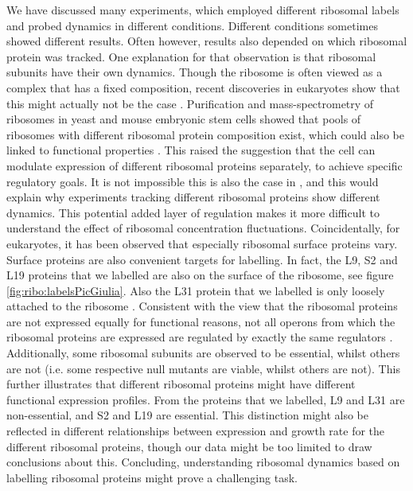 We have discussed many experiments, which employed different ribosomal labels and probed dynamics in different conditions.
%
Different conditions sometimes showed different results.
%
Often however, results also depended on which ribosomal protein was tracked.
%
One explanation for that observation is that ribosomal subunits have their own dynamics.
%
Though the ribosome is often viewed as a complex that has a fixed composition, 
recent discoveries in eukaryotes show that this might actually not be the case \cite{Preiss2016, Slavov2015}.
%
Purification and mass-spectrometry of ribosomes in yeast and mouse embryonic stem cells showed that 
pools of ribosomes with different ribosomal protein composition exist, which could also be linked to functional properties \cite{Slavov2015}.
%
This raised the suggestion that the cell can modulate expression of different ribosomal proteins separately, 
to achieve specific regulatory goals.
%
It is not impossible this is also the case in \ecoli, and this would explain why experiments tracking different ribosomal proteins show different dynamics.
%
This potential added layer of regulation makes it more difficult to understand the effect of ribosomal concentration fluctuations.
Coincidentally, for eukaryotes, it has been observed that especially ribosomal surface proteins vary.
Surface proteins are also convenient targets for labelling.
In fact, the L9, S2 and L19 proteins that we  labelled are also on the surface of the ribosome, see figure \ref{fig:ribo:labelsPicGiulia}.
Also the L31 protein that we labelled is only loosely attached to the ribosome \cite{Walker2016t}.
%
Consistent with the view that the ribosomal proteins are not expressed equally for functional reasons, 
not all operons from which the ribosomal proteins are expressed are regulated by exactly the same regulators \cite{Keseler2017}.
%
Additionally, some ribosomal subunits are observed to be essential, whilst others are not (i.e. some respective null mutants are viable, whilst others are not).
This further illustrates that different ribosomal proteins might have different functional expression profiles.
%
From the proteins that we labelled, L9 and L31 are non-essential, and S2 and L19 are essential.
%
This distinction might also be reflected in different relationships between expression and growth rate for the different ribosomal proteins, 
though our data might be too limited to draw conclusions about this.
%
%
Concluding, understanding ribosomal dynamics based on labelling ribosomal proteins might prove a challenging task.

